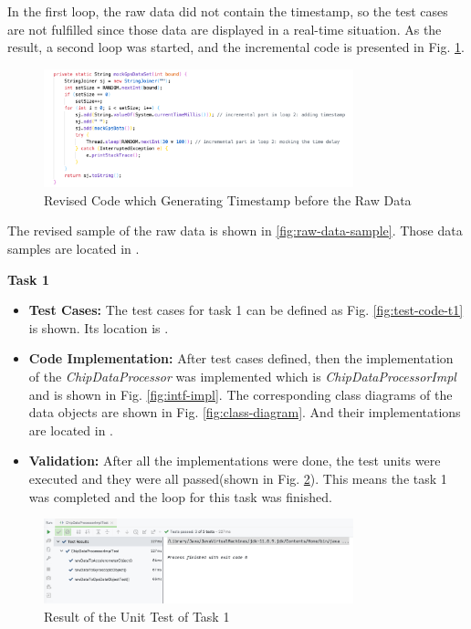 \documentclass[technote, transmag, onecolumn, 9pt]{IEEEtran}
\begin{document}
In the first loop, the raw data did not contain the timestamp, so the test cases are not fulfilled
since those data are displayed in a real-time situation.
As the result, a second loop was started, and the incremental code is presented in Fig. \ref{fig:incre-code-1}.

\begin{figure}[!ht]
	\centering
	\includegraphics[width=0.8\textwidth]{./img/f12-incremental-code-1.png}
	\caption{Revised Code which Generating Timestamp before the Raw Data}
	\label{fig:incre-code-1}
\end{figure}

The revised sample of the raw data is shown in \ref{fig:raw-data-sample}.
Those data samples are located in .


\textbf{Task 1}

\begin{itemize}
	\item \textbf{Test Cases:} The test cases for task 1 can be defined as Fig. \ref{fig:test-code-t1} is shown.
	      Its location is .

	\item \textbf{Code Implementation:} After test cases defined, then the implementation of the \textit{ChipDataProcessor} was implemented
	      which is \textit{ChipDataProcessorImpl} and is shown in Fig. \ref{fig:intf-impl}.
	      The corresponding class diagrams of the data objects are shown in Fig. \ref{fig:class-diagram}.
	      And their implementations are located in .

	\item \textbf{Validation:} After all the implementations were done, the test units were executed
	      and they were all passed(shown in Fig. \ref{fig:test-result}).
	      This means the task 1 was completed and the loop for this task was finished.
\end{itemize}

\begin{figure}[!ht]
	\centering
	\includegraphics[width=0.8\textwidth]{./img/f19-t1-test-result.png}
	\caption{Result of the Unit Test of Task 1}
	\label{fig:test-result}
\end{figure}
\end{document}
